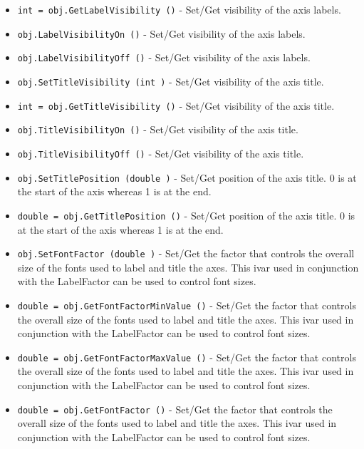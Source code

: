 \begin{itemize}
\item  \verb|int = obj.GetLabelVisibility ()| -  Set/Get visibility of the axis labels.

\item  \verb|obj.LabelVisibilityOn ()| -  Set/Get visibility of the axis labels.

\item  \verb|obj.LabelVisibilityOff ()| -  Set/Get visibility of the axis labels.

\item  \verb|obj.SetTitleVisibility (int )| -  Set/Get visibility of the axis title.

\item  \verb|int = obj.GetTitleVisibility ()| -  Set/Get visibility of the axis title.

\item  \verb|obj.TitleVisibilityOn ()| -  Set/Get visibility of the axis title.

\item  \verb|obj.TitleVisibilityOff ()| -  Set/Get visibility of the axis title.

\item  \verb|obj.SetTitlePosition (double )| -  Set/Get position of the axis title. 0 is at the start of the
 axis whereas 1 is at the end.

\item  \verb|double = obj.GetTitlePosition ()| -  Set/Get position of the axis title. 0 is at the start of the
 axis whereas 1 is at the end.

\item  \verb|obj.SetFontFactor (double )| -  Set/Get the factor that controls the overall size of the fonts used
 to label and title the axes. This ivar used in conjunction with
 the LabelFactor can be used to control font sizes.

\item  \verb|double = obj.GetFontFactorMinValue ()| -  Set/Get the factor that controls the overall size of the fonts used
 to label and title the axes. This ivar used in conjunction with
 the LabelFactor can be used to control font sizes.

\item  \verb|double = obj.GetFontFactorMaxValue ()| -  Set/Get the factor that controls the overall size of the fonts used
 to label and title the axes. This ivar used in conjunction with
 the LabelFactor can be used to control font sizes.

\item  \verb|double = obj.GetFontFactor ()| -  Set/Get the factor that controls the overall size of the fonts used
 to label and title the axes. This ivar used in conjunction with
 the LabelFactor can be used to control font sizes.


\end{itemize}
